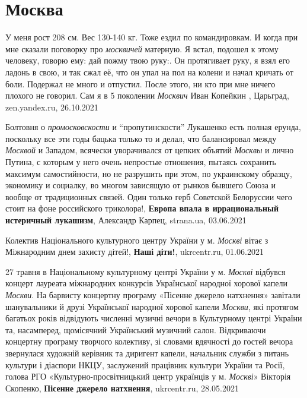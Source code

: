  
 
 
 
 
\chapter{Москва}
\label{sec:slova.moskva}

У меня рост 208 см. Вес 130-140 кг. Тоже ездил по командировкам. И когда при
мне сказали поговорку про \emph{москвичей} матерную. Я встал, подошел к этому
человеку, говорю ему: дай пожму твою руку:. Он протягивает руку, я взял его
ладонь в свою, и так сжал её, что он упал на пол на колени и начал кричать от
боли. Подержал не много и отпустил. После этого, ни кто при мне ничего плохого
не говорил. Сам я в 5 поколении \emph{Москвич}
Иван Копейкин
, 
Царьград, zen.yandex.ru, 26.10.2021

Болтовня о \emph{промосковскости} и \enquote{пропутинскости} Лукашенко есть полная ерунда,
поскольку все эти годы бацька только то и делал, что балансировал между \emph{Москвой}
и Западом, всячески уворачивался от цепких объятий \emph{Москвы} и лично Путина, с
которым у него очень непростые отношения, пытаясь сохранить максимум
самостийности, но не разрушить при этом, по украинскому образцу, экономику и
социалку, во многом зависящую от рынков бывшего Союза и вообще от традиционных
связей. Один только герб Советской Белоруссии чего стоит на фоне российского
триколора!,
\textbf{Европа впала в иррациональный истеричный лукашизм}, Александр Карпец,
strana.ua, 03.06.2021

Колектив Національного культурного центру України у м. \emph{Москві} вітає з Міжнародним днем захисту дітей!, 
\textbf{Наші діти!}, ukrcentr.ru, 01.06.2021

27 травня в Національному культурному центрі України у м. \emph{Москві} відбувся
концерт лауреата міжнародних конкурсів Української народної хорової капели
\emph{Москви}. На барвисту концертну програму «Пісенне джерело натхнення» завітали
шанувальники й друзі Української народної хорової капели \emph{Москви}, які протягом
багатьох років відвідують численні музичні вечори в Культурному центрі України
та, насамперед, щомісячний Український музичний салон. Відкриваючи концертну
програму творчого колективу, зі словами вдячності до гостей вечора звернулася
художній керівник та диригент капели, начальник служби з питань культури і
діаспори НКЦУ, заслужений працівник культури України та Росії, голова РГО
«Культурно-просвітницький центр українців у м. \emph{Москві}» Вікторія Скопенко,
\textbf{Пісенне джерело натхнення}, ukrcentr.ru, 28.05.2021

